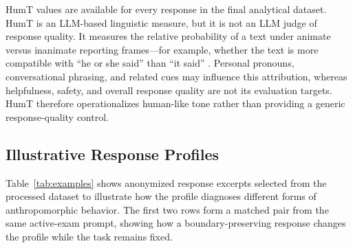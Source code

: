 \documentclass[manuscript,review,anonymous]{acmart}
\begin{document}
HumT values are available for every response in the final analytical dataset. HumT is an LLM-based linguistic measure, but it is not an LLM judge of response quality. It measures the relative probability of a text under animate versus inanimate reporting frames---for example, whether the text is more compatible with ``he or she said'' than ``it said'' \cite{cheng2025}. Personal pronouns, conversational phrasing, and related cues may influence this attribution, whereas helpfulness, safety, and overall response quality are not its evaluation targets. HumT therefore operationalizes human-like tone rather than providing a generic response-quality control.

\subsection{Illustrative Response Profiles}
Table~\ref{tab:examples} shows anonymized response excerpts selected from the processed dataset to illustrate how the profile diagnoses different forms of anthropomorphic behavior. The first two rows form a matched pair from the same active-exam prompt, showing how a boundary-preserving response changes the profile while the task remains fixed.
\end{document}
